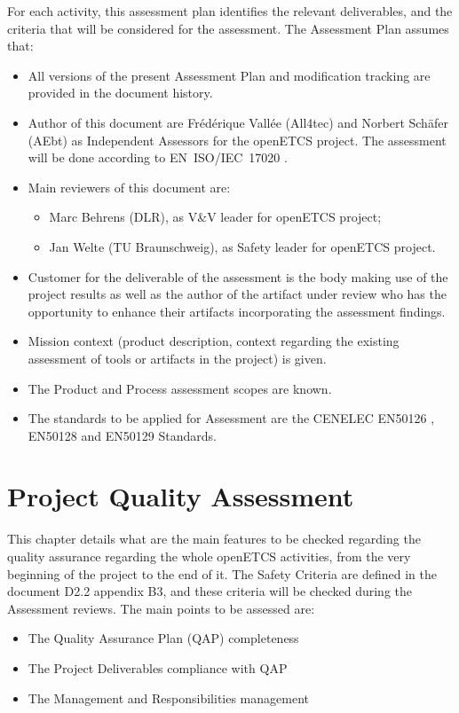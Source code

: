 \documentclass[openetcs]{template/openetcs_article}
\begin{document}
For each activity, this assessment plan identifies the relevant deliverables, and the criteria that will be considered for the assessment.
The Assessment Plan assumes that: 
\begin{itemize}
\item All versions of the present Assessment Plan and modification tracking are provided in the document history.
\item Author of this document are Fr\'ed\'erique Vall\'ee (All4tec) and Norbert Sch\"afer (AEbt) as Independent Assessors for the openETCS project. The assessment will be done according to EN~ISO/IEC~17020 \cite{EN17020}.
\item Main reviewers of this document are:
	\begin{itemize}
	\item Marc Behrens (DLR), as V\&V leader for openETCS project;
	\item Jan Welte (TU Braunschweig), as Safety leader for openETCS project.
	\end{itemize}
\item Customer for the deliverable of the assessment is the body making use of the project results as well as the author of the artifact under review who has the opportunity to enhance their artifacts incorporating the assessment findings.
\item Mission context (product description, context regarding the existing assessment of tools or artifacts in the project) is given.
\item The Product and Process assessment scopes are known.
\item The standards to be applied for Assessment are the CENELEC EN50126 \cite{EN50126} , EN50128 \cite{EN50128} and EN50129 \cite{EN50129} Standards.
\end{itemize}


\newpage
\section{Project Quality Assessment}
This chapter details what are the main features to be checked regarding the quality assurance regarding the whole openETCS activities, from the very beginning
of the project to the end of it.
The Safety Criteria are defined in the document D2.2 \cite{D22} appendix B3, and these criteria will be checked during the Assessment reviews. The main points to
be assessed are:
\begin{itemize}
\item The Quality Assurance Plan (QAP) completeness
\item The Project Deliverables compliance with QAP
\item The Management and Responsibilities management 
\end{itemize}
\end{document}
